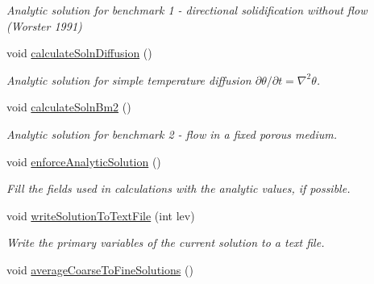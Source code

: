 \begin{DoxyCompactItemize}
\begin{DoxyCompactList}\small\item\em Analytic solution for benchmark 1 -\/ directional solidification without flow (Worster 1991) \end{DoxyCompactList}\item 
\hypertarget{classamr_mushy_layer_a2b24a38504f094c84f33481e81e3c5ac}{void \hyperlink{classamr_mushy_layer_a2b24a38504f094c84f33481e81e3c5ac}{calculate\-Soln\-Diffusion} ()}\label{classamr_mushy_layer_a2b24a38504f094c84f33481e81e3c5ac}

\begin{DoxyCompactList}\small\item\em Analytic solution for simple temperature diffusion $ \partial \theta / \partial t = \nabla^2 \theta $. \end{DoxyCompactList}\item 
\hypertarget{classamr_mushy_layer_a9c562e8758d467e0e917ae2fd5b35c3c}{void \hyperlink{classamr_mushy_layer_a9c562e8758d467e0e917ae2fd5b35c3c}{calculate\-Soln\-Bm2} ()}\label{classamr_mushy_layer_a9c562e8758d467e0e917ae2fd5b35c3c}

\begin{DoxyCompactList}\small\item\em Analytic solution for benchmark 2 -\/ flow in a fixed porous medium. \end{DoxyCompactList}\item 
\hypertarget{classamr_mushy_layer_a026ec617dc4f07424222aed6e1ada71e}{void \hyperlink{classamr_mushy_layer_a026ec617dc4f07424222aed6e1ada71e}{enforce\-Analytic\-Solution} ()}\label{classamr_mushy_layer_a026ec617dc4f07424222aed6e1ada71e}

\begin{DoxyCompactList}\small\item\em Fill the fields used in calculations with the analytic values, if possible. \end{DoxyCompactList}\item 
\hypertarget{classamr_mushy_layer_a72a4f6cf4f003bc955237811f5f17e05}{void \hyperlink{classamr_mushy_layer_a72a4f6cf4f003bc955237811f5f17e05}{write\-Solution\-To\-Text\-File} (int lev)}\label{classamr_mushy_layer_a72a4f6cf4f003bc955237811f5f17e05}

\begin{DoxyCompactList}\small\item\em Write the primary variables of the current solution to a text file. \end{DoxyCompactList}\item 
\hypertarget{classamr_mushy_layer_ad108111c89c43cb54a5d362fc3425a12}{void \hyperlink{classamr_mushy_layer_ad108111c89c43cb54a5d362fc3425a12}{average\-Coarse\-To\-Fine\-Solutions} ()}\label{classamr_mushy_layer_ad108111c89c43cb54a5d362fc3425a12}


\end{DoxyCompactItemize}
